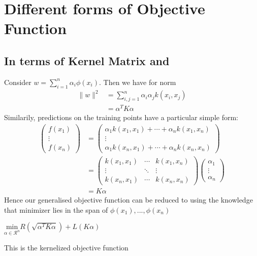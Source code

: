 \documentclass[12pt]{article}
\begin{document}
\section{Different forms of Objective Function}
\subsection{In terms of Kernel Matrix and \boldsymbol{$\alpha$}}
Consider $w = \sum_{i=1}^n\alpha_i\phi(x_i)$. Then we have for norm
\begin{align*}
    \|w\|^2 &= \sum_{i,j=1}^n \alpha_i\alpha_j k(x_i,x_j)\\
            &= \alpha^TK\alpha
\end{align*}
Similarily, predictions on the training points have a particular simple form:
\begin{align*}
    \begin{pmatrix}
        f(x_1)\\
        \vdots\\
        f(x_n)
    \end{pmatrix} &= \begin{pmatrix}
        \alpha_1k(x_1,x_1)+\cdots+\alpha_n k(x_1,x_n)\\
        \vdots\\
        \alpha_1k(x_n,x_1)+\cdots+\alpha_n k(x_n,x_n)
    \end{pmatrix}\\
    &= \begin{pmatrix}
        k(x_1,x_1) & \cdots & k(x_1,x_n)\\
        \vdots & \ddots & \vdots \\
        k(x_n,x_1) & \cdots & k(x_n,x_n)
    \end{pmatrix}\begin{pmatrix}
        \alpha_1\\
        \vdots\\
        \alpha_n
    \end{pmatrix}\\
    &= K\alpha
\end{align*}
Hence our generalised objective function can be reduced to using the knowledge that minimizer lies in the span of $\phi(x_1),...,\phi(x_n)$
\begin{center}
    $\underset{\alpha\in\mathcal{R}^n}{\text{min}} R(\sqrt{\alpha^TK\alpha}) + L(K\alpha)$
\end{center}
This is the kernelized objective function
\end{document}

